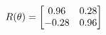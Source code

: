 \documentclass[preview]{standalone}
\begin{document}
\begin{align*}
\special{dvisvgm:raw <g id='unique000'>}R(\theta) = \begin{bmatrix}0.96 & 0.28\\-0.28 & 0.96\end{bmatrix}\special{dvisvgm:raw </g>}
\end{align*}
\end{document}
